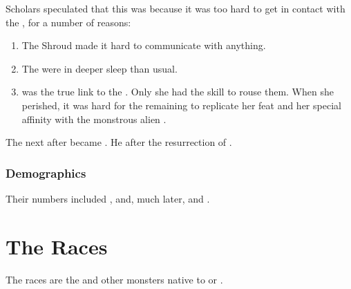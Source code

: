 Scholars speculated that this was because it was too hard to get in contact with the \xss, for a number of reasons:

\begin{enumerate}
  \item The Shroud made it hard to communicate with anything.
  \item The \xss{} were in deeper sleep than usual.
  \item 
    \Tiamat{} was the true link to the \xss.
    Only she had the skill to rouse them. 
    When she perished, it was hard for the remaining \dragons{} to replicate her feat and her special affinity with the monstrous alien \xss. 
\end{enumerate}

The next \shaeeroth{} after \Secherdamon{} became \Vizsherioch. 
He  after the resurrection of \Nithdornazsh. 










\subsection{Demographics}
Their numbers included ,  and, much later,  and . 

























\chapter{The \Erebean Races}
The \Erebean{} races are the \banes{} and other monsters native to \Erebos{} or \Nyx. 















